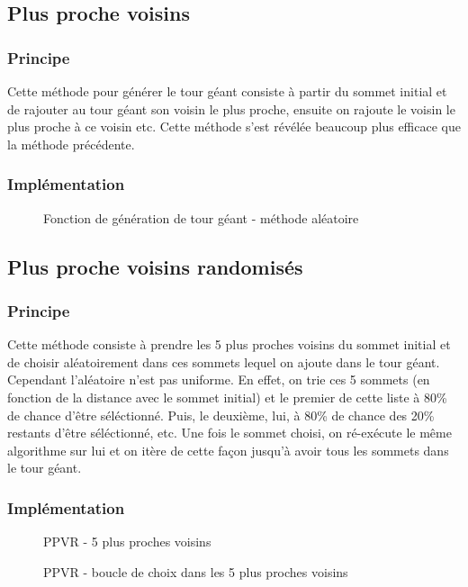 \documentclass{article}
\begin{document}
\subsection{Plus proche voisins}
\subsubsection{Principe}
Cette méthode pour générer le tour géant consiste à partir du sommet initial et de rajouter
au tour géant son voisin le plus proche, ensuite on rajoute le voisin le plus proche à
ce voisin etc. Cette méthode s'est révélée beaucoup plus efficace que la méthode précédente.
\newpage
\subsubsection{Implémentation}
\begin{figure}[!ht]
  \centering
  \caption{Fonction de génération de tour géant - méthode aléatoire}
  
\end{figure}

\subsection{Plus proche voisins randomisés}
\subsubsection{Principe}
Cette méthode consiste à prendre les 5 plus proches voisins du sommet initial et de choisir
aléatoirement dans ces sommets lequel on ajoute dans le tour géant. Cependant l'aléatoire
n'est pas uniforme. En effet, on trie ces 5 sommets (en fonction de la distance avec le
sommet initial) et le premier de cette liste à 80\% de chance d'être séléctionné. Puis, le
deuxième, lui, à 80\% de chance des 20\% restants d'être séléctionné, etc. Une fois le
sommet choisi, on ré-exécute le même algorithme sur lui et on itère de cette façon jusqu'à
avoir tous les sommets dans le tour géant.

\newpage
\subsubsection{Implémentation}
\begin{figure}[!ht]
  \centering
  \caption{PPVR - 5 plus proches voisins}
  
\end{figure}
\begin{figure}[!ht]
  \centering
  \caption{PPVR - boucle de choix dans les 5 plus proches voisins}
  
\end{figure}
\end{document}
